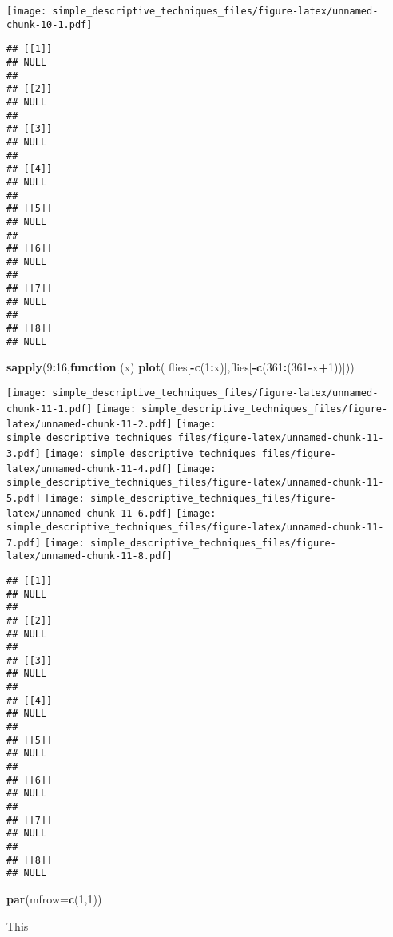 \documentclass[]{article}
\newenvironment{Shaded}{\begin{snugshade}}{\end{snugshade}}
\newcommand{\ControlFlowTok}[1]{\textcolor[rgb]{0.13,0.29,0.53}{\textbf{#1}}}
\newcommand{\DataTypeTok}[1]{\textcolor[rgb]{0.13,0.29,0.53}{#1}}
\newcommand{\DecValTok}[1]{\textcolor[rgb]{0.00,0.00,0.81}{#1}}
\newcommand{\KeywordTok}[1]{\textcolor[rgb]{0.13,0.29,0.53}{\textbf{#1}}}
\newcommand{\NormalTok}[1]{#1}
\newcommand{\OperatorTok}[1]{\textcolor[rgb]{0.81,0.36,0.00}{\textbf{#1}}}
\begin{document}
\texttt{[image: simple\_descriptive\_techniques\_files/figure-latex/unnamed-chunk-10-1.pdf]}

\begin{verbatim}
## [[1]]
## NULL
## 
## [[2]]
## NULL
## 
## [[3]]
## NULL
## 
## [[4]]
## NULL
## 
## [[5]]
## NULL
## 
## [[6]]
## NULL
## 
## [[7]]
## NULL
## 
## [[8]]
## NULL
\end{verbatim}

\begin{Shaded}
\begin{Highlighting}[]
\KeywordTok{sapply}\NormalTok{(}\DecValTok{9}\OperatorTok{:}\DecValTok{16}\NormalTok{,}\ControlFlowTok{function}\NormalTok{ (x) }\KeywordTok{plot}\NormalTok{( flies[}\OperatorTok{-}\KeywordTok{c}\NormalTok{(}\DecValTok{1}\OperatorTok{:}\NormalTok{x)],flies[}\OperatorTok{-}\KeywordTok{c}\NormalTok{(}\DecValTok{361}\OperatorTok{:}\NormalTok{(}\DecValTok{361}\OperatorTok{-}\NormalTok{x}\OperatorTok{+}\DecValTok{1}\NormalTok{))]))}
\end{Highlighting}
\end{Shaded}

\texttt{[image: simple\_descriptive\_techniques\_files/figure-latex/unnamed-chunk-11-1.pdf]}
\texttt{[image: simple\_descriptive\_techniques\_files/figure-latex/unnamed-chunk-11-2.pdf]}
\texttt{[image: simple\_descriptive\_techniques\_files/figure-latex/unnamed-chunk-11-3.pdf]}
\texttt{[image: simple\_descriptive\_techniques\_files/figure-latex/unnamed-chunk-11-4.pdf]}
\texttt{[image: simple\_descriptive\_techniques\_files/figure-latex/unnamed-chunk-11-5.pdf]}
\texttt{[image: simple\_descriptive\_techniques\_files/figure-latex/unnamed-chunk-11-6.pdf]}
\texttt{[image: simple\_descriptive\_techniques\_files/figure-latex/unnamed-chunk-11-7.pdf]}
\texttt{[image: simple\_descriptive\_techniques\_files/figure-latex/unnamed-chunk-11-8.pdf]}

\begin{verbatim}
## [[1]]
## NULL
## 
## [[2]]
## NULL
## 
## [[3]]
## NULL
## 
## [[4]]
## NULL
## 
## [[5]]
## NULL
## 
## [[6]]
## NULL
## 
## [[7]]
## NULL
## 
## [[8]]
## NULL
\end{verbatim}

\begin{Shaded}
\begin{Highlighting}[]
\KeywordTok{par}\NormalTok{(}\DataTypeTok{mfrow=}\KeywordTok{c}\NormalTok{(}\DecValTok{1}\NormalTok{,}\DecValTok{1}\NormalTok{))}
\end{Highlighting}
\end{Shaded}

This
\end{document}
